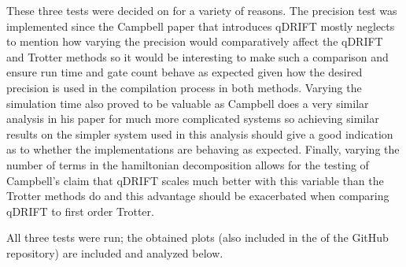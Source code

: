 \documentclass[letterpaper, 11pt]{article}
\begin{document}
These three tests were decided on for a variety of reasons. The precision test was implemented since the Campbell paper that introduces qDRIFT mostly neglects to mention how varying the precision would comparatively affect the qDRIFT and Trotter methods so it would be interesting to make such a comparison and ensure run time and gate count behave as expected given how the desired precision is used in the compilation process in both methods. Varying the simulation time also proved to be valuable as Campbell does a very similar analysis in his paper for much more complicated systems so achieving similar results on the simpler system used in this analysis should give a good indication as to whether the implementations are behaving as expected. Finally, varying the number of terms in the hamiltonian decomposition allows for the testing of Campbell's claim that qDRIFT scales much better with this variable than the Trotter methods do and this advantage should be exacerbated when comparing qDRIFT to first order Trotter. 

All three tests were run; the obtained plots (also included in the  of the GitHub repository) are included and analyzed below.
\end{document}
